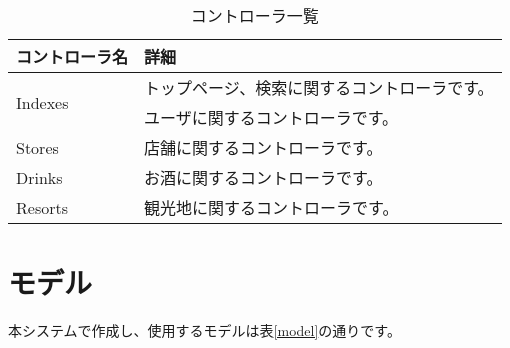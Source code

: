 \documentclass[a4j,titlepage]{jarticle}
\begin{document}
\begin{table}[!htbp]
\caption{コントローラ一覧}
\label{controller}
\small
\begin{center}
\begin{tabular}{|l|p{5cm}|}\hline
コントローラ名 & 詳細 \\\hline\hline
\multirow{2}{*}{Indexes} & トップページ、検索に関するコントローラです。 \\\hline
Users & ユーザに関するコントローラです。 \\\hline
Stores & 店舗に関するコントローラです。 \\\hline
Drinks & お酒に関するコントローラです。 \\\hline
Resorts & 観光地に関するコントローラです。 \\\hline
\end{tabular}
\end{center}
\end{table}

\section{モデル}

本システムで作成し、使用するモデルは表\ref{model}の通りです。
\end{document}
